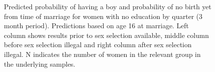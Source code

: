 \documentclass[12pt,letterpaper]{article}
\begin{document}
\begin{figure}[htpb!]
{\begin{minipage}{0.28\textwidth}
\captionsetup[subfigure]{labelformat=parens}
\end{minipage}
}
\setcounter{subfigure}{3}
\caption{Predicted probability of having a boy and probability of
no birth yet from time of marriage for women with no education by quarter (3 month
period). 
Predictions based on age 16 at marriage.
Left column shows results prior to sex selection available, middle column before
sex selection illegal and right column after sex selection illegal.
N indicates the number of women in the relevant group in the underlying samples.
}
\label{fig:results_spell1_low}
\end{figure}
\end{document}

